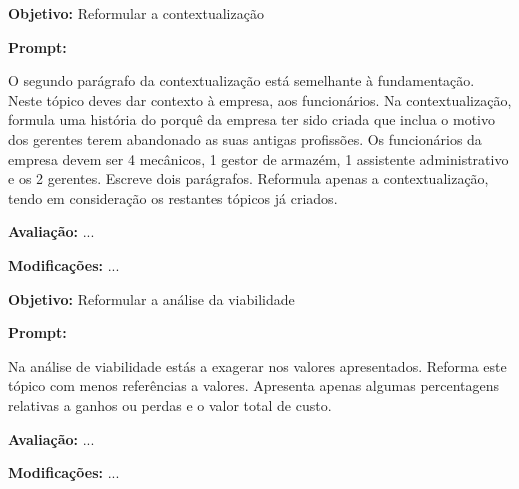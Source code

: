 \documentclass[a4paper,12pt]{scrreprt}
\begin{document}
\begin{tcolorbox}[
	title={Prompt P4 - Reformulação da contextualização},
	colback=white,
	colframe=black,
	arc=2mm,
	boxrule=0.5pt
	]
	\textbf{Objetivo:} Reformular a contextualização \par
	\textbf{Prompt:} 
	\begin{tcolorbox}[
		listing only,
		breakable,
		enhanced,
		colback=white,
		colframe=black,
		listing options={
			breaklines=true,
			basicstyle=\ttfamily\small
		}
		]
		O segundo parágrafo da contextualização está semelhante à fundamentação. Neste tópico deves dar contexto à empresa, aos funcionários.
		Na contextualização, formula uma história do porquê da empresa ter sido criada que inclua o motivo dos gerentes terem abandonado as suas antigas profissões. Os funcionários da empresa devem ser 4 mecânicos, 1 gestor de armazém, 1 assistente administrativo e os 2 gerentes. Escreve dois parágrafos. Reformula apenas a contextualização, tendo em consideração os restantes tópicos já criados.
	\end{tcolorbox}
	\par
	\textbf{Avaliação:} ... \par
	\textbf{Modificações:} ... \par
\end{tcolorbox}

\begin{tcolorbox}[
	title={Prompt P5 - Reformulação da análise da viabilidade},
	colback=white,
	colframe=black,
	arc=2mm,
	boxrule=0.5pt
	]
	\textbf{Objetivo:} Reformular a análise da viabilidade \par
	\textbf{Prompt:} 
	\begin{tcolorbox}[
		listing only,
		breakable,
		enhanced,
		colback=white,
		colframe=black,
		listing options={
			breaklines=true,
			basicstyle=\ttfamily\small
		}
		]
		Na análise de viabilidade estás a exagerar nos valores apresentados. Reforma este tópico com menos referências a valores. Apresenta apenas algumas percentagens relativas a ganhos ou perdas e o valor total de custo.
	\end{tcolorbox}
	\par
	\textbf{Avaliação:} ... \par
	\textbf{Modificações:} ... \par
\end{tcolorbox}
\end{document}
